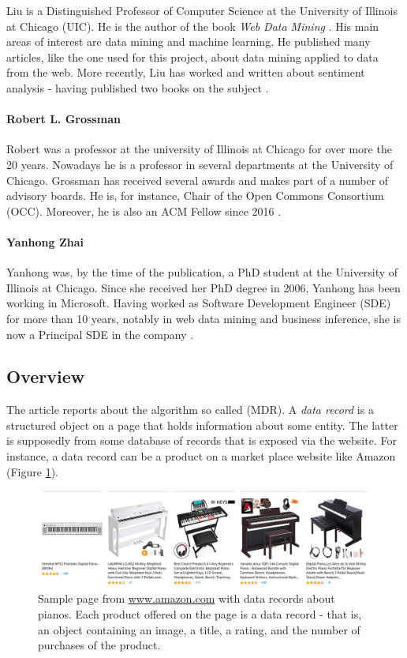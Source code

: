 \documentclass[11pt]{article}
\begin{document}
Liu is a Distinguished Professor of Computer Science at the University of Illinois at Chicago (UIC). He is the author of the book \emph{Web Data Mining} \citep{web-data-mining}. His main areas of interest are data mining and machine learning. He published many articles, like the one used for this project, about data mining applied to data from the web. More recently, Liu has worked and written about sentiment analysis - having published two books on the subject \citep{liu-page}.

\paragraph{Robert L. Grossman}

Robert was a professor at the university of Illinois at Chicago for over more the 20 years. Nowadays he is a professor in several departments at the University of Chicago. Grossman has received several awards and makes part of a number of advisory boards. He is, for instance, Chair of the Open Commons Consortium (OCC). Moreover, he is also an ACM Fellow since 2016 \citep{robert-page, robert-linkedin}.

\paragraph{Yanhong Zhai}

Yanhong was, by the time of the publication, a PhD student at the University of Illinois at Chicago. Since she received her PhD degree in 2006, Yanhong has been working in Microsoft. Having worked as Software Development Engineer (SDE) for more than 10 years, notably in web data mining and business inference, she is now a Principal SDE in the company \citep{yanhong-page, yanhong-linkedin}.

\subsection{Overview}

The article reports about the algorithm so called  (MDR). A \emph{data record} is a structured object on a page that holds information about some entity. The latter is supposedly from some database of records that is exposed via the website. For instance, a data record can be a product on a market place website like Amazon (Figure \ref{fig:pianos}).

\begin{figure}
  \includegraphics[width=\linewidth]{fig/pianos.png}
  \caption{Sample page from \href{www.amazon.com}{www.amazon.com} with data records about pianos. Each product offered on the page is a data record - that is, an object containing an image, a title, a rating, and the number of purchases of the product.}
  \label{fig:pianos}
\end{figure}
\end{document}

